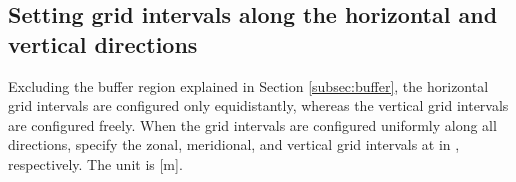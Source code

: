 \subsection{Setting grid intervals along the horizontal and vertical directions} \label{subsec:gridinterv}

Excluding the buffer region explained in Section \ref{subsec:buffer}, the horizontal grid intervals are configured only equidistantly, whereas the 
 vertical grid intervals are configured freely. When the grid intervals are  configured uniformly along all directions, specify the zonal, meridional, and vertical grid intervals  at  in , respectively. The unit is [m].


